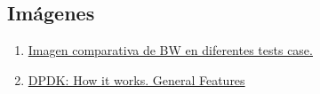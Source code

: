 \documentclass[12pt]{article}
\begin{document}
	\subsection{Imágenes}
	\begin{enumerate}
		\item 
		\label{bib:img1}\href{https://www.accton.com/Technology-Brief/intel-dpdk-performance-on-the-sau5081i-server/}{Imagen comparativa de BW en diferentes tests case.}
		
		\item
		\label{bib:img2} \href{https://blog.selectel.com/introduction-dpdk-architecture-principles/}{DPDK: How it works. General Features}
		
		
	\end{enumerate}
	
\end{document}
